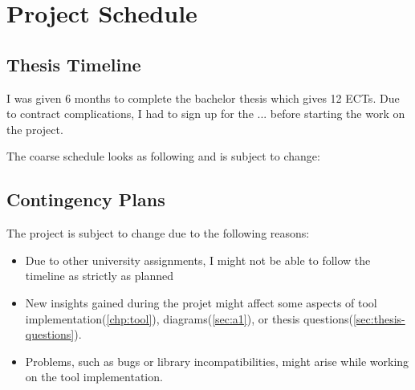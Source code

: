 \chapter{Project Schedule}
\label{chp:schedule}

\section{Thesis Timeline}
\label{sec:gantt}

I was given 6 months to complete the bachelor thesis which gives 12 ECTs.
Due to contract complications, I had to sign up for the ... before starting the work on the project.

The coarse schedule looks as following and is subject to change:


\section{Contingency Plans}
\label{sec:contingency}

The project is subject to change due to the following reasons:

\begin{itemize}
    \item Due to other university assignments, I might not be able to follow the timeline as strictly as planned
    \item New insights gained during the projet might affect some aspects of tool implementation(\ref{chp:tool}), diagrams(\ref{sec:a1}), or thesis questions(\ref{sec:thesis-questions}).
    \item Problems, such as bugs or library incompatibilities, might arise while working on the tool implementation.
\end{itemize}